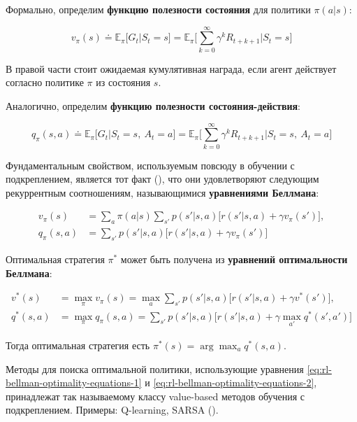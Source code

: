 \documentclass[12pt,a4paper]{amsart}
\begin{document}
Формально, определим \textbf{функцию полезности состояния} для политики $\pi(a|s)$:

\begin{equation} \label{eq:rl-value-function}
v_{\pi}(s) \doteq \mathbb{E}_{\pi}\lbrack G_t | S_t = s\rbrack = \mathbb{E}_{\pi}\bigg[\sum_{k=0}^{\infty}  \gamma^k R_{t+k+1} \bigg| S_t = s \bigg]
\end{equation}

В правой части стоит ожидаемая кумулятивная награда, если агент действует согласно политике $\pi$ из состояния $s$.

Аналогично, определим \textbf{функцию полезности состояния-действия}:

\begin{equation} \label{eq:rl-qvalue-function}
q_{\pi}(s, a) \doteq \mathbb{E}_{\pi}\lbrack G_t | S_t = s,~ A_t = a\rbrack = \mathbb{E}_{\pi}\bigg[\sum_{k=0}^{\infty}  \gamma^k R_{t+k+1} \bigg| S_t = s,~ A_t = a\bigg]
\end{equation}

Фундаментальным свойством, используемым повсюду в обучении с подкреплением, является тот факт (\cite{sutton1998reinforcement}), что они удовлетворяют следующим рекуррентным соотношениям, называющимися \textbf{уравнениями Беллмана}:

\begin{align}
v_{\pi}(s) &= \sum_a \pi(a | s) \sum_{s'} p(s' | s, a) \lbrack r(s' | s, a) + \gamma v_{\pi}(s') \rbrack, \label{eq:rl-bellman-equations-1} \\
q_{\pi}(s, a) &= \sum_{s'} p(s' | s, a) \lbrack r(s' | s, a) + \gamma v_{\pi}(s') \rbrack \label{eq:rl-bellman-equations-2}
\end{align}

Оптимальная стратегия $\pi^*$ может быть получена из \textbf{уравнений оптимальности Беллмана}:

\begin{align}
v^*(s) &= \max_{\pi} v_{\pi}(s) = \max_a \sum_{s'} p(s' | s, a) \lbrack r(s' | s, a) + \gamma v^*(s') \rbrack, \label{eq:rl-bellman-optimality-equations-1}\\
q^*(s, a) &= \max_{\pi} q_{\pi}(s, a) = \sum_{s'} p(s' | s, a) \lbrack r(s' | s, a) + \gamma \max_{a'}q^*(s', a') \rbrack \label{eq:rl-bellman-optimality-equations-2}
\end{align}

Тогда оптимальная стратегия есть $\pi^*(s) = \arg\max_a q^*(s, a)$.

Методы для поиска оптимальной политики, использующие уравнения \eqref{eq:rl-bellman-optimality-equations-1} и \eqref{eq:rl-bellman-optimality-equations-2}, принадлежат так называемому классу value-based методов обучения с подкреплением. Примеры: Q-learning, SARSA (\cite{sutton1998reinforcement}).
\end{document}
